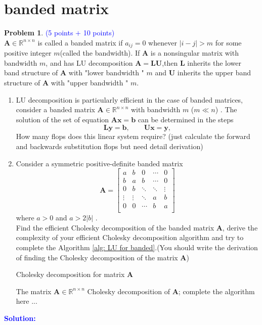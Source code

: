 \documentclass[english,onecolumn]{IEEEtran}
\begin{document}
\section{banded matrix}

\noindent\textbf{Problem 1}. \textcolor{blue}{(5 points $+$ 10 points)}\\
  $\mathbf{A} \in \mathbb{R}^{n \times n}$ is called a banded matrix if $a_{ij} = 0$ whenever $|i-j| > m$ for some positive integer $m$(called the bandwidth). If $\mathbf{A}$ is a nonsingular matrix with bandwidth $m$, and  has LU decomposition $\mathbf{A} = \mathbf{LU}$,then $\mathbf{L}$ inherits the lower band structure of $\mathbf{A}$ with "lower bandwidth " $m$ and  $\mathbf{U}$ inherits the upper band structure of $\mathbf{A}$ with "upper bandwidth " $m$. \\
  
\begin{enumerate}
   
    \item LU decomposition is particularly efficient in the case of banded matrices, consider a banded matrix $\mathbf{A} \in \mathbb{R}^{n \times n}$ with bandwidth $m$ ($m \ll n$) . The solution of the set of equation $\mathbf{Ax = b}$ can be determined in the steps 
     $$\mathbf{Ly = b}, \qquad   \mathbf{Ux = y},$$
      How many flops does this linear system require? (just calculate the forward and backwards substitution flops but need detail derivation) 
    \item  Consider a symmetric positive-definite banded matrix 
    $$\mathbf{A} = \begin{bmatrix}
    a & b   & 0  & \cdots &0 \\
    b & a  & b & \cdots & 0 \\
    0   & b  &\ddots &\ddots   & \vdots \\
    \vdots& \vdots&\ddots & a& b \\
    0   & 0  &\cdots   &b & a \\
    \end{bmatrix}$$
    where $a >0$ and $ a > 2 \vert b \vert $ .\\
    Find the efficient  Cholesky  decomposition of the banded matrix $\mathbf{A}$, derive the complexity of your efficient Cholesky decomposition algorithm  and try to complete the Algorithm \ref{alg: LU for banded}.(You should write the derivation of finding the Cholesky decomposition of the matrix $\mathbf{A}$)
    \begin{algorithm}[htb]
    \caption{  Cholesky  decomposition for matrix $\mathbf{A}$}
    \label{alg: LU for banded}
     \begin{algorithmic}[1]
    \Require
     The matrix $\mathbf{A} \in \mathbb{R}^{n \times n}$
    \Ensure
     Cholesky  decomposition  of $\mathbf{A}$;
    \State complete the algorithm here ...
  \end{algorithmic}
\end{algorithm}

 
\end{enumerate}
\noindent\textcolor{blue}{
	\textbf{Solution:}
	}
\end{document}
